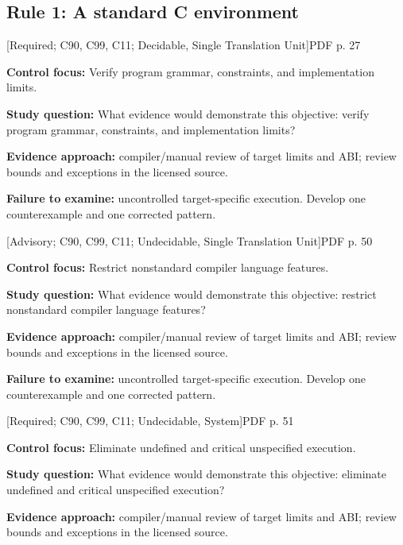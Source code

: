 \documentclass[10pt,letterpaper]{article}
\begin{document}
\subsection{Rule 1: A standard C environment}
 \textsf{\footnotesize [Required; C90, C99, C11; Decidable, Single Translation Unit]}\hfill{\footnotesize PDF p. 27}\par
\textbf{Control focus:} Verify program grammar, constraints, and implementation limits.\par
\textbf{Study question:} What evidence would demonstrate this objective: verify program grammar, constraints, and implementation limits?\par
\textbf{Evidence approach:} compiler/manual review of target limits and ABI; review bounds and exceptions in the licensed source.\par
\textbf{Failure to examine:} uncontrolled target-specific execution. Develop one counterexample and one corrected pattern.\par
\smallskip
{}
 \textsf{\footnotesize [Advisory; C90, C99, C11; Undecidable, Single Translation Unit]}\hfill{\footnotesize PDF p. 50}\par
\textbf{Control focus:} Restrict nonstandard compiler language features.\par
\textbf{Study question:} What evidence would demonstrate this objective: restrict nonstandard compiler language features?\par
\textbf{Evidence approach:} compiler/manual review of target limits and ABI; review bounds and exceptions in the licensed source.\par
\textbf{Failure to examine:} uncontrolled target-specific execution. Develop one counterexample and one corrected pattern.\par
\smallskip
{}
 \textsf{\footnotesize [Required; C90, C99, C11; Undecidable, System]}\hfill{\footnotesize PDF p. 51}\par
\textbf{Control focus:} Eliminate undefined and critical unspecified execution.\par
\textbf{Study question:} What evidence would demonstrate this objective: eliminate undefined and critical unspecified execution?\par
\textbf{Evidence approach:} compiler/manual review of target limits and ABI; review bounds and exceptions in the licensed source.\par
\end{document}
